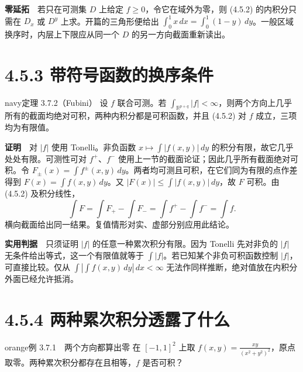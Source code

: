 \documentclass[11pt,a4paper]{article}
\begin{document}
\textbf{零延拓}　若只在可测集 \(D\) 上给定 \(f\ge0\)，令它在域外为零，则
(4.5.2) 的内积分只需在 \(D_x\) 或 \(D^y\) 上求。开篇的三角形便给出
\(\int_0^1 x\,dx=\int_0^1(1-y)\,dy\)。一般区域换序时，内层上下限应从同一个
\(D\) 的另一方向截面重新读出。

\section[\S{}4.5.3
带符号函数的换序条件]{4.5.3
带符号函数的换序条件}\label{ux5e26ux7b26ux53f7ux51fdux6570ux7684ux6362ux5e8fux6761ux4ef6}

\begin{sboxenv}{navy}{定理 3.7.2（Fubini）}
设 \(f\) 联合可测。若
\(\int_{\mathbb R^{p+q}}|f|<\infty\)，则两个方向上几乎所有的截面均绝对可积，两种内积分都是可积函数，并且
(4.5.2) 对 \(f\) 成立，三项均为有限值。

\end{sboxenv}

\textbf{证明}　对 \(|f|\) 使用 Tonelli。非负函数
\(x\mapsto\int |f(x,y)|\,dy\) 的积分有限，故它几乎处处有限。可测性可对
\(f^+\)、\(f^-\) 使用上一节的截面论证；因此几乎所有截面绝对可积。令
\(F_\pm(x)=\int f^\pm(x,y)\,dy\)。两者均可测且可积，在它们同为有限的点作差得到
\(F(x)=\int f(x,y)\,dy\)。又 \(|F(x)|\le\int |f(x,y)|\,dy\)，故 \(F\)
可积。由 (4.5.2) 及积分线性， \begin{equation*}
\int F=\int F_+-\int F_-=\int f^+-\int f^-=\int f.
\end{equation*} 横向截面给出同一结果。复值情形对实、虚部分别应用此结论。

\textbf{实用判据}　只须证明 \(|f|\) 的任意一种累次积分有限。因为 Tonelli
先对非负的 \(|f|\) 无条件给出等式，这一个有限值就等于
\(\int|f|\)。若已知某个非负可积函数控制 \(|f|\)，可直接比较。仅从
\(\int|\int f(x,y)\,dy|\,dx<\infty\)
无法作同样推断，绝对值放在内积分外面已经允许抵消。

\section[\S{}4.5.4
两种累次积分透露了什么]{4.5.4
两种累次积分透露了什么}\label{ux4e24ux79cdux7d2fux6b21ux79efux5206ux900fux9732ux4e86ux4ec0ux4e48}

\begin{sboxenv}{orange}{例 3.7.1　两个方向都算出零}
在 \([-1,1]^2\) 上取
\(f(x,y)=\frac{xy}{(x^2+y^2)^2}\)，原点取零。两种累次积分都存在且相等，\(f\)
是否可积？

\end{sboxenv}
\end{document}
